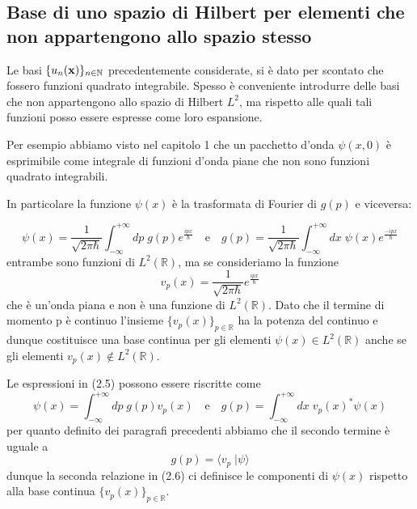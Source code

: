 \subsection{Base di uno spazio di Hilbert per elementi che non appartengono allo spazio stesso}

Le basi $\{ u_n (\bold{x})\}_{n \in \mathbb{N}}$ precedentemente considerate, si \`e dato per scontato che fossero funzioni quadrato integrabile. Spesso \`e conveniente introdurre delle basi che non appartengono allo spazio di Hilbert $L^2$, ma rispetto alle quali tali funzioni posso essere espresse come loro espansione.

\noindent Per esempio abbiamo visto nel capitolo 1 che un pacchetto d'onda $\psi(x,0)$ \`e esprimibile come integrale di funzioni d'onda piane che non sono funzioni quadrato integrabili.

\noindent In particolare la funzione $\psi(x)$ \`e la trasformata di Fourier di $g(p)$ e viceversa:

\begin{equation}
	\psi(x) = \frac{1}{\sqrt{2\pi \hbar}} \int_{-\infty}^{+\infty} dp \; g(p) e^{\frac{ipx}{\hbar}} \quad \text{e} \quad g(p) = \frac{1}{\sqrt{2 \pi \hbar}} \int_{-\infty}^{+\infty} dx \; \psi(x)e^{\frac{-ipx}{\hbar}}
\end{equation}
entrambe sono funzioni di $L^2(\mathbb{R})$, ma se consideriamo la funzione 
\begin{equation*}
v_p(x) = \frac{1}{\sqrt{2 \pi \hbar}}e^{\frac{ipx}{\hbar}}
\end{equation*}
che \`e un'onda piana e non \`e una funzione di $L^2(\mathbb{R})$. Dato che il termine di momento p \`e continuo l'insieme $\{v_p(x) \}_{p \in \mathbb{R}}$ ha la potenza del continuo e dunque costituisce una base continua per gli elementi $\psi(x) \in L^2(\mathbb{R})$ anche se gli elementi $v_p(x) \notin L^2(\mathbb{R})$.

\noindent Le espressioni in (2.5) possono essere riscritte come 
\begin{equation}
	\psi(x) = \int_{-\infty}^{+\infty} dp \; g(p)v_p(x) \quad \text{e} \quad g(p) = \int_{- \infty}^{+\infty} dx \; v_p(x)^* \psi(x)
\end{equation}
per quanto definito dei paragrafi precedenti abbiamo che il secondo termine \`e uguale a 
\begin{equation*}
	g(p) = \langle v_p \;| \psi \rangle
\end{equation*}
dunque la seconda relazione in (2.6) ci definisce le componenti di $\psi(x)$ rispetto alla base continua $\{v_p(x)\}_{p \in \mathbb{R}}$. 

